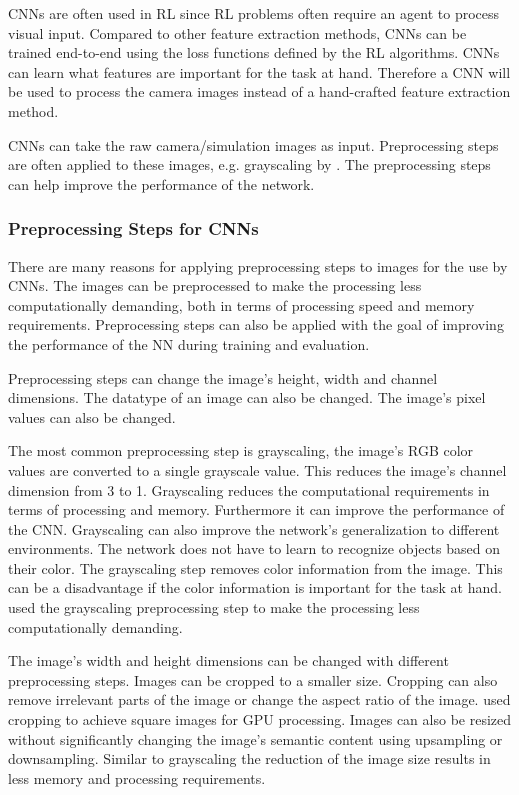 \acp{CNN} are often used in \ac{RL} since RL problems often require an agent to process visual input. Compared to other feature extraction methods, \acp{CNN} can be trained end-to-end using the loss functions defined by the \ac{RL} algorithms. \acp{CNN} can learn what features are important for the task at hand.
Therefore a \ac{CNN} will be used to process the camera images instead of a hand-crafted feature extraction method. 

\acp{CNN} can take the raw camera/simulation images as input. Preprocessing steps are often applied to these images, e.g. grayscaling by \textcite{atari}. 
The preprocessing steps can help improve the performance of the network.


\subsubsection{Preprocessing Steps for \acp{CNN}}

There are many reasons for applying preprocessing steps to images for the use by \acp{CNN}. The images can be preprocessed to make the processing less computationally demanding, both in terms of processing speed and memory requirements. Preprocessing steps can also be applied with the goal of improving the performance of the \ac{NN} during training and evaluation. 

Preprocessing steps can change the image's height, width and channel dimensions. The datatype of an image can also be changed. The image's pixel values can also be changed.

The most common preprocessing step is grayscaling, the image's RGB color values are converted to a single grayscale value. This reduces the image's channel dimension from 3 to 1. Grayscaling reduces the computational requirements in terms of processing and memory. Furthermore it can improve the performance of the \ac{CNN}. Grayscaling can also improve the network's generalization to different environments. The network does not have to learn to recognize objects based on their color. The grayscaling step removes color information from the image. This can be a disadvantage if the color information is important for the task at hand.
\textcite{atari} used the grayscaling preprocessing step to make the processing less computationally demanding. 


The image's width and height dimensions can be changed with different preprocessing steps. Images can be cropped to a smaller size. Cropping can also remove irrelevant parts of the image or change the aspect ratio of the image. \textcite{atari} used cropping to achieve square images for GPU processing. Images can also be resized without significantly changing the image's semantic content using upsampling or downsampling. Similar to grayscaling the reduction of the image size results in less memory and processing requirements.


